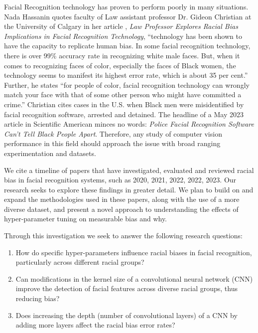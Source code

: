 \documentclass[conference]{IEEEtran}
\begin{document}
Facial Recognition technology has proven to perform poorly in many situations. Nada Hassanin quotes faculty of Law assistant professor Dr. Gideon Christian at the University of Calgary in her article \cite{Hassanin_2023}, \textit{Law Professor Explores Racial Bias Implications in Facial Recognition Technology}, “technology has been shown to have the capacity to replicate human bias. In some facial recognition technology, there is over 99\% accuracy rate in recognizing white male faces. But, when it comes to recognizing faces of color, especially the faces of Black women, the technology seems to manifest its highest error rate, which is about 35 per cent.” Further, he states “for people of color, facial recognition technology can wrongly match your face with that of some other person who might have committed a crime.” Christian cites cases in the U.S. when Black men were misidentified by facial recognition software, arrested and detained. The headline of a May 2023 article in Scientific American minces no words: \textit{Police Facial Recognition Software Can’t Tell Black People Apart}. Therefore, any study of computer vision performance in this field should approach the issue with broad ranging experimentation and datasets.

We cite a timeline of papers that have investigated, evaluated and reviewed racial bias in facial recognition systems, such as\cite{hellstrom2020bias} 2020,\cite{karkkainen2021fairface} 2021, \cite{yucer2022measuring} 2022, \cite{dhar2022distill} 2022, \cite{yucer2023racial} 2023. Our research seeks to explore these findings in greater detail. We plan to build on and expand the methodologies used in these papers, along with the use of a more diverse dataset, and present a novel approach to understanding the effects of hyper-parameter tuning on measurable bias and why.

Through this investigation we seek to answer the following research questions:
\begin{enumerate}
    \item How do specific hyper-parameters influence racial biases in facial recognition, particularly across different racial groups?
    \item Can modifications in the kernel size of a convolutional neural network (CNN) improve the detection of facial features across diverse racial groups, thus reducing bias?
    \item Does increasing the depth (number of convolutional layers) of a CNN by adding more layers affect the racial bias error rates?
\end{enumerate}
\end{document}
